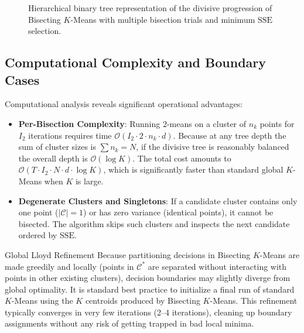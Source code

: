 \begin{figure}[htbp]
\caption{Hierarchical binary tree representation of the divisive progression of Bisecting $K$-Means with multiple bisection trials and minimum $\mathrm{SSE}$ selection.}
\label{fig:dm-bisecting-kmeans-tree}
\end{figure}


\subsection{Computational Complexity and Boundary Cases}

Computational analysis reveals significant operational advantages:
\begin{itemize}
    \item \textbf{Per-Bisection Complexity}: Running $2$-means on a cluster of $n_k$ points for $I_2$ iterations requires time $\mathcal{O}(I_2 \cdot 2 \cdot n_k \cdot d)$. Because at any tree depth the sum of cluster sizes is $\sum n_k = N$, if the divisive tree is reasonably balanced the overall depth is $\mathcal{O}(\log K)$. The total cost amounts to $\mathcal{O}(T \cdot I_2 \cdot N \cdot d \cdot \log K)$, which is significantly faster than standard global $K$-Means when $K$ is large.
    \item \textbf{Degenerate Clusters and Singletons}: If a candidate cluster contains only one point ($|\mathcal{C}| = 1$) or has zero variance (identical points), it cannot be bisected. The algorithm skips such clusters and inspects the next candidate ordered by $\mathrm{SSE}$.
\end{itemize}

\begin{noteblock}{Global Lloyd Refinement}
Because partitioning decisions in Bisecting $K$-Means are made greedily and locally (points in $\mathcal{C}^*$ are separated without interacting with points in other existing clusters), decision boundaries may slightly diverge from global optimality. It is standard best practice to initialize a final run of standard $K$-Means using the $K$ centroids produced by Bisecting $K$-Means. This refinement typically converges in very few iterations (2--4 iterations), cleaning up boundary assignments without any risk of getting trapped in bad local minima.
\end{noteblock}

